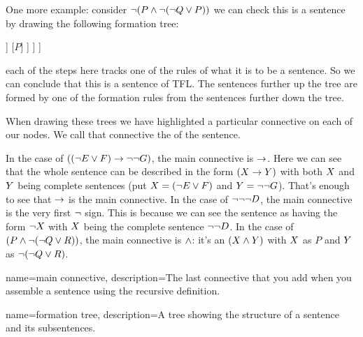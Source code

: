 One more example: consider $\neg (P \mathbin{\wedge} \neg (\neg Q \vee P))$ we can check this is a sentence by drawing the following formation tree:
\label{S:formationtree}
\begin{center}
\begin{forest}
	[$\mainconnective{\enot}\,  (P \eand \enot (\enot Q \eor P))$
		[$(P \,\mainconnective{\eand}\,  \enot (\enot Q \eor P))$
			[$P$]
			[$\mainconnective{\enot}\,   (\enot Q\eor P)$
				[$\mainconnective{\enot}\,   Q$
					[$Q$]
				]
				[$P$]
			]
		]
	]
\end{forest}
\end{center}
each of the steps here tracks one of the rules of what it is to be a sentence. So we can conclude that this is a sentence of TFL. The sentences further up the tree are formed by one of the formation rules from the sentences further down the tree.

When drawing these trees we have highlighted a particular connective on each of our nodes. We call that connective the  of the sentence.

In the case of $((\neg E \vee F) \rightarrow \neg\neg G)$, the main connective is $\rightarrow$. Here we can see that the whole sentence can be described in the form $(X\rightarrow Y)$ with both $X$ and $Y$ being complete sentences (put $X=(\neg E\vee F)$ and $Y=\neg\neg G$). That's enough to see that $\rightarrow$ is the main connective. In the case of $\neg\neg\neg D$, the main connective is the very first $\neg$ sign. This is because we can see the sentence as having the form $\neg X$ with $X$ being the complete sentence $\neg\neg D$. In the case of $(P \mathbin{\wedge} \neg (\neg Q \vee R))$, the main connective is $\mathbin{\wedge}$: it's an $(X\mathbin{\wedge}Y)$ with $X$ as $P$ and $Y$ as $\neg (\neg Q \vee R)$.

{
	name=main connective,
	description={The last connective that you add when you assemble a sentence using the recursive definition.}
}

{
	name=formation tree,
	description={A tree showing the structure of a sentence and its subsentences.}
}





